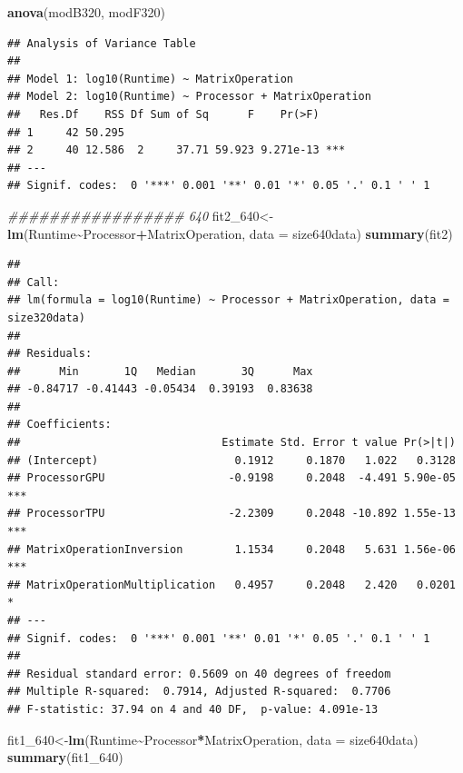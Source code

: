 \documentclass[
]{article}
\newenvironment{Shaded}{\begin{snugshade}}{\end{snugshade}}
\newcommand{\CommentTok}[1]{\textcolor[rgb]{0.56,0.35,0.01}{\textit{#1}}}
\newcommand{\DataTypeTok}[1]{\textcolor[rgb]{0.13,0.29,0.53}{#1}}
\newcommand{\DecValTok}[1]{\textcolor[rgb]{0.00,0.00,0.81}{#1}}
\newcommand{\KeywordTok}[1]{\textcolor[rgb]{0.13,0.29,0.53}{\textbf{#1}}}
\newcommand{\NormalTok}[1]{#1}
\newcommand{\OperatorTok}[1]{\textcolor[rgb]{0.81,0.36,0.00}{\textbf{#1}}}
\begin{document}
\begin{Shaded}
\begin{Highlighting}[]
\KeywordTok{anova}\NormalTok{(modB320, modF320)}
\end{Highlighting}
\end{Shaded}

\begin{verbatim}
## Analysis of Variance Table
## 
## Model 1: log10(Runtime) ~ MatrixOperation
## Model 2: log10(Runtime) ~ Processor + MatrixOperation
##   Res.Df    RSS Df Sum of Sq      F    Pr(>F)    
## 1     42 50.295                                  
## 2     40 12.586  2     37.71 59.923 9.271e-13 ***
## ---
## Signif. codes:  0 '***' 0.001 '**' 0.01 '*' 0.05 '.' 0.1 ' ' 1
\end{verbatim}

\begin{Shaded}
\begin{Highlighting}[]
\CommentTok{\#\#\#\#\#\#\#\#\#\#\#\#\#\#\#\#\# 640}
\NormalTok{fit2\_}\DecValTok{640}\NormalTok{\textless{}{-}}\KeywordTok{lm}\NormalTok{(Runtime}\OperatorTok{\textasciitilde{}}\NormalTok{Processor}\OperatorTok{+}\NormalTok{MatrixOperation, }\DataTypeTok{data =}\NormalTok{ size640data)}
\KeywordTok{summary}\NormalTok{(fit2)}
\end{Highlighting}
\end{Shaded}

\begin{verbatim}
## 
## Call:
## lm(formula = log10(Runtime) ~ Processor + MatrixOperation, data = size320data)
## 
## Residuals:
##      Min       1Q   Median       3Q      Max 
## -0.84717 -0.41443 -0.05434  0.39193  0.83638 
## 
## Coefficients:
##                               Estimate Std. Error t value Pr(>|t|)    
## (Intercept)                     0.1912     0.1870   1.022   0.3128    
## ProcessorGPU                   -0.9198     0.2048  -4.491 5.90e-05 ***
## ProcessorTPU                   -2.2309     0.2048 -10.892 1.55e-13 ***
## MatrixOperationInversion        1.1534     0.2048   5.631 1.56e-06 ***
## MatrixOperationMultiplication   0.4957     0.2048   2.420   0.0201 *  
## ---
## Signif. codes:  0 '***' 0.001 '**' 0.01 '*' 0.05 '.' 0.1 ' ' 1
## 
## Residual standard error: 0.5609 on 40 degrees of freedom
## Multiple R-squared:  0.7914, Adjusted R-squared:  0.7706 
## F-statistic: 37.94 on 4 and 40 DF,  p-value: 4.091e-13
\end{verbatim}

\begin{Shaded}
\begin{Highlighting}[]
\NormalTok{fit1\_}\DecValTok{640}\NormalTok{\textless{}{-}}\KeywordTok{lm}\NormalTok{(Runtime}\OperatorTok{\textasciitilde{}}\NormalTok{Processor}\OperatorTok{*}\NormalTok{MatrixOperation, }\DataTypeTok{data =}\NormalTok{ size640data)}
\KeywordTok{summary}\NormalTok{(fit1\_}\DecValTok{640}\NormalTok{)}
\end{Highlighting}
\end{Shaded}
\end{document}
